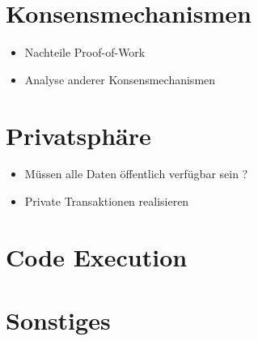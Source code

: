\section{Konsensmechanismen}




\begin{itemize}
    \item Nachteile Proof-of-Work
    \item Analyse anderer Konsensmechanismen
\end{itemize}

\section{Privatsphäre}

\begin{itemize}
    \item Müssen alle Daten öffentlich verfügbar sein ?
    \item Private Transaktionen realisieren
\end{itemize}

\section{Code Execution}

\section{Sonstiges}





